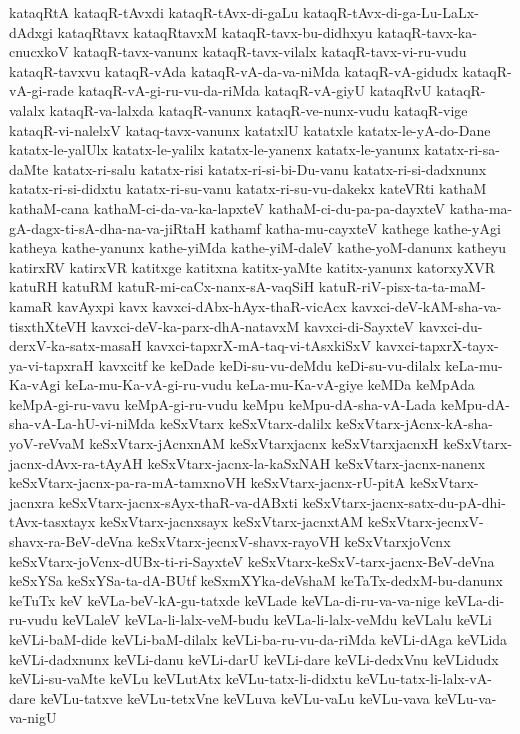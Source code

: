 {kataqRtA
kataqR-tAvxdi
kataqR-tAvx-di-gaLu
kataqR-tAvx-di-ga-Lu-LaLx-dAdxgi
kataqRtavx
kataqRtavxM
kataqR-tavx-bu-didhxyu
kataqR-tavx-ka-cnucxkoV
kataqR-tavx-vanunx
kataqR-tavx-vilalx
kataqR-tavx-vi-ru-vudu
kataqR-tavxvu
kataqR-vAda
kataqR-vA-da-va-niMda
kataqR-vA-gidudx
kataqR-vA-gi-rade
kataqR-vA-gi-ru-vu-da-riMda
kataqR-vA-giyU
kataqRvU
kataqR-valalx
kataqR-va-lalxda
kataqR-vanunx
kataqR-ve-nunx-vudu
kataqR-vige
kataqR-vi-nalelxV
kataq-tavx-vanunx
katatxlU
katatxle
katatx-le-yA-do-Dane
katatx-le-yalUlx
katatx-le-yalilx
katatx-le-yanenx
katatx-le-yanunx
katatx-ri-sa-daMte
katatx-ri-salu
katatx-risi
katatx-ri-si-bi-Du-vanu
katatx-ri-si-dadxnunx
katatx-ri-si-didxtu
katatx-ri-su-vanu
katatx-ri-su-vu-dakekx
kateVRti
kathaM
kathaM-cana
kathaM-ci-da-va-ka-lapxteV
kathaM-ci-du-pa-pa-dayxteV
katha-ma-gA-dagx-ti-sA-dha-na-va-jiRtaH
kathamf
katha-mu-cayxteV
kathege
kathe-yAgi
katheya
kathe-yanunx
kathe-yiMda
kathe-yiM-daleV
kathe-yoM-danunx
katheyu
katirxRV
katirxVR
katitxge
katitxna
katitx-yaMte
katitx-yanunx
katorxyXVR
katuRH
katuRM
katuR-mi-caCx-nanx-sA-vaqSiH
katuR-riV-pisx-ta-ta-maM-kamaR
kavAyxpi
kavx
kavxci-dAbx-hAyx-thaR-vicAcx
kavxci-deV-kAM-sha-va-tisxthXteVH
kavxci-deV-ka-parx-dhA-natavxM
kavxci-di-SayxteV
kavxci-du-derxV-ka-satx-masaH
kavxci-tapxrX-mA-taq-vi-tAsxkiSxV
kavxci-tapxrX-tayx-ya-vi-tapxraH
kavxcitf
ke
keDade
keDi-su-vu-deMdu
keDi-su-vu-dilalx
keLa-mu-Ka-vAgi
keLa-mu-Ka-vA-gi-ru-vudu
keLa-mu-Ka-vA-giye
keMDa
keMpAda
keMpA-gi-ru-vavu
keMpA-gi-ru-vudu
keMpu
keMpu-dA-sha-vA-Lada
keMpu-dA-sha-vA-La-hU-vi-niMda
keSxVtarx
keSxVtarx-dalilx
keSxVtarx-jAcnx-kA-sha-yoV-reVvaM
keSxVtarx-jAcnxnAM
keSxVtarxjacnx
keSxVtarxjacnxH
keSxVtarx-jacnx-dAvx-ra-tAyAH
keSxVtarx-jacnx-la-kaSxNAH
keSxVtarx-jacnx-nanenx
keSxVtarx-jacnx-pa-ra-mA-tamxnoVH
keSxVtarx-jacnx-rU-pitA
keSxVtarx-jacnxra
keSxVtarx-jacnx-sAyx-thaR-va-dABxti
keSxVtarx-jacnx-satx-du-pA-dhi-tAvx-tasxtayx
keSxVtarx-jacnxsayx
keSxVtarx-jacnxtAM
keSxVtarx-jecnxV-shavx-ra-BeV-deVna
keSxVtarx-jecnxV-shavx-rayoVH
keSxVtarxjoVcnx
keSxVtarx-joVcnx-dUBx-ti-ri-SayxteV
keSxVtarx-keSxV-tarx-jacnx-BeV-deVna
keSxYSa
keSxYSa-ta-dA-BUtf
keSxmXYka-deVshaM
keTaTx-dedxM-bu-danunx
keTuTx
keV
keVLa-beV-kA-gu-tatxde
keVLade
keVLa-di-ru-va-va-nige
keVLa-di-ru-vudu
keVLaleV
keVLa-li-lalx-veM-budu
keVLa-li-lalx-veMdu
keVLalu
keVLi
keVLi-baM-dide
keVLi-baM-dilalx
keVLi-ba-ru-vu-da-riMda
keVLi-dAga
keVLida
keVLi-dadxnunx
keVLi-danu
keVLi-darU
keVLi-dare
keVLi-dedxVnu
keVLidudx
keVLi-su-vaMte
keVLu
keVLutAtx
keVLu-tatx-li-didxtu
keVLu-tatx-li-lalx-vA-dare
keVLu-tatxve
keVLu-tetxVne
keVLuva
keVLu-vaLu
keVLu-vava
keVLu-va-va-nigU
}
